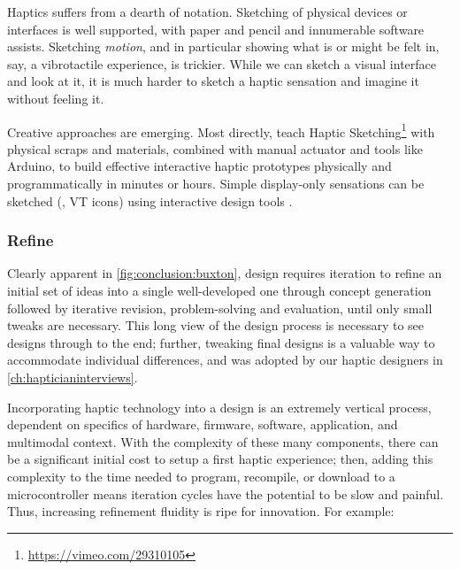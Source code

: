 	Haptics suffers from a dearth of notation.
	Sketching of physical devices or interfaces is well supported, with paper and pencil and innumerable software assists.
	Sketching \textit{motion}, and in particular showing what is or might be felt in, say, a vibrotactile experience, is  trickier.
	While we can sketch a visual interface and look at it, it is much harder to sketch a haptic sensation and imagine it without feeling it.

Creative approaches are emerging.
Most directly, \citet{Moussette2011} teach Haptic Sketching\footnote{\url{https://vimeo.com/29310105}} with physical scraps and materials, combined with manual actuator and tools like Arduino, to build effective interactive haptic prototypes physically and programmatically  in minutes or hours.
Simple display-only sensations can be sketched (\eg, VT icons)  using interactive design tools \cite{schneider2014improvising,Hong2013}.





%
%
\subsubsection{Refine}
Clearly apparent in \autoref{fig:conclusion:buxton}, design requires iteration to refine an initial set of ideas into a single well-developed one through concept generation followed by iterative revision, problem-solving and  evaluation, until only small tweaks are necessary.
This long view of the design process is necessary to see designs through to the end;
further, tweaking final designs is a valuable way to accommodate individual differences, and was adopted by our haptic designers in \autoref{ch:hapticianinterviews}.

Incorporating haptic technology into a design is an extremely vertical process,  dependent on  specifics of hardware, firmware, software, application, and multimodal context.
With the complexity of these many components, there can be a significant initial cost to setup a first haptic experience; then, adding this complexity to the time needed to program, recompile, or download to a microcontroller means iteration cycles have the potential to be slow and painful. 
%
Thus, increasing refinement fluidity is ripe for innovation. For example:

